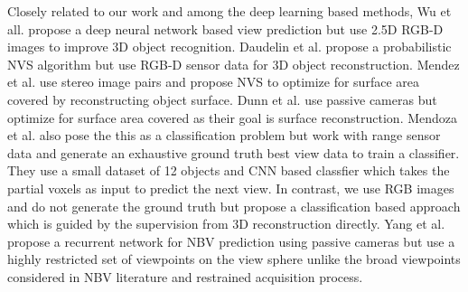 Closely related to our work and among the deep learning based methods, Wu et all. \cite{wu20153d} propose a deep neural network based view prediction but use 2.5D RGB-D images to improve 3D object recognition.
Daudelin et al. \cite{daudelin2017adaptable} propose a probabilistic NVS algorithm but use RGB-D sensor data for 3D object reconstruction.
Mendez et al. \cite{mendez2016next} use stereo image pairs and propose NVS to optimize for surface area covered by reconstructing object surface.
Dunn et al. \cite{dunn2009next} use passive cameras but optimize for surface area covered as their goal is surface reconstruction.
Mendoza et al. \cite{mendoza2020supervised} also pose the this as a classification problem but work with range sensor data and generate an exhaustive ground truth best view data to train a classifier.
They use a small dataset of 12 objects and CNN based classfier which takes the partial voxels as input to predict the next view. 
In contrast, we use RGB images and do not generate the ground truth but propose a classification based approach which is guided by the supervision from 3D reconstruction directly.
Yang et al. \cite{yang2018active} propose a recurrent network for NBV prediction using passive cameras but use a highly restricted set of viewpoints on the view sphere unlike the broad viewpoints considered in NBV literature and restrained acquisition process.
